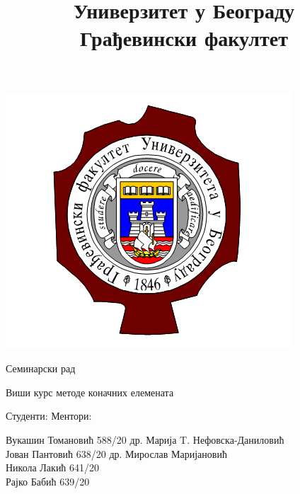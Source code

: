 \documentclass[11pt, a4paper]{article}
\begin{document}
\thispagestyle{empty}
\setcounter{tocdepth}{2}
\thispagestyle{empty}
\title{\vspace{-1cm} Универзитет у Београду\\ Грађевински факултет}
\date{\vspace{-5ex}}
\maketitle
\begin{center}
\includegraphics[scale=1]{Slike/Grb.png}
\end{center}
 
\begin{center}
\Huge {Семинарски рад}
\end{center}
\vspace{1cm}
\begin{center}
\huge{Виши курс методе коначних елемената}
\end{center}
\vspace{3cm}

\Large{Студенти:
\hfill
Ментори:
\par
Вукашин Томановић 588/20
\hfill
др. Марија T. Нефовска-Даниловић\\
Јован Пантовић 638/20
\hfill
др. Мирослав Маријановић\\
Никола Лакић 641/20 \\
Рајко Бабић 639/20
  }

\thispagestyle{empty}
\newpage

\tableofcontents{}
\thispagestyle{empty}
\newpage
\setcounter{page}{1}
\end{document}
